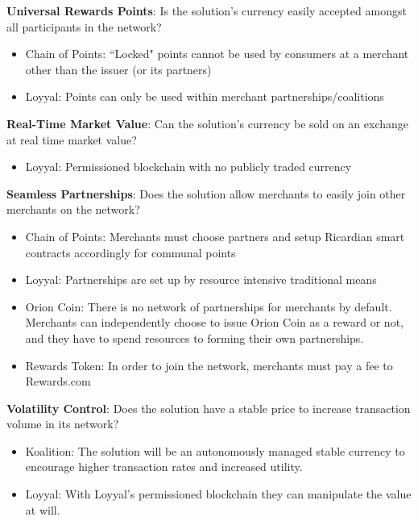 \textbf{Universal Rewards Points}: Is the solution's currency easily accepted amongst all participants in the network? \\
\begin{itemize}
\item Chain of Points: ``Locked" points cannot be used by consumers at a merchant other than the issuer (or its partners)
\item Loyyal: Points can only be used within merchant partnerships/coalitions
\end{itemize}

\textbf{Real-Time Market Value}: Can the solution's currency be sold on an exchange at real time market value? \\
\begin{itemize}
\item Loyyal: Permissioned blockchain with no publicly traded currency 
\end{itemize}

\textbf{Seamless Partnerships}: Does the solution allow merchants to easily join other merchants on the network? \\
\begin{itemize}
\item Chain of Points: Merchants must choose partners and setup Ricardian smart contracts accordingly for communal points 
\item Loyyal: Partnerships are set up by resource intensive traditional means
\item Orion Coin: There is no network of partnerships for merchants by default. Merchants can independently choose to issue Orion Coin as a reward or not, and they have to spend resources to forming their own partnerships.  
\item Rewards Token: In order to join the network, merchants must pay a fee to Rewards.com
\end{itemize}

\textbf{Volatility Control}: Does the solution have a stable price to increase transaction volume in its network? \\
\begin{itemize}
\item Koalition: The solution will be an autonomously managed stable currency to encourage higher transaction rates and increased utility.
\item Loyyal: With Loyyal's permissioned blockchain they can manipulate the value at will. 
\end{itemize}

